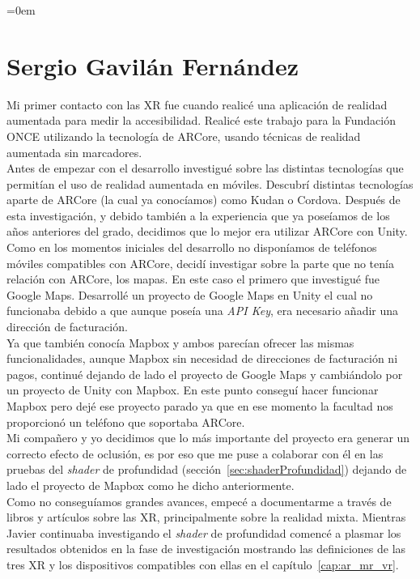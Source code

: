 \parindent=0em
\section{Sergio Gavilán Fernández}
\noindent

Mi primer contacto con las XR fue cuando realicé una aplicación de realidad aumentada para medir la accesibilidad. Realicé este trabajo para la Fundación ONCE utilizando la tecnología de ARCore, usando técnicas de realidad aumentada sin marcadores.\\

Antes de empezar con el desarrollo investigué sobre las distintas tecnologías que permitían el uso de realidad aumentada en móviles. Descubrí distintas tecnologías aparte de ARCore (la cual ya conocíamos) como Kudan o Cordova. Después de esta investigación, y debido también a la experiencia que ya poseíamos de los años anteriores del grado, decidimos que lo mejor era utilizar ARCore con Unity.\\

Como en los momentos iniciales del desarrollo no disponíamos de teléfonos móviles compatibles con ARCore, decidí investigar sobre la parte que no tenía relación con ARCore, los mapas. En este caso el primero que investigué fue Google Maps. Desarrollé un proyecto de Google Maps en Unity el cual no funcionaba debido a que aunque poseía una \textit{API Key}, era necesario añadir una dirección de facturación.\\

Ya que también conocía Mapbox y ambos parecían ofrecer las mismas funcionalidades, aunque Mapbox sin necesidad de direcciones de facturación ni pagos, continué dejando de lado el proyecto de Google Maps y cambiándolo por un proyecto de Unity con Mapbox. En este punto conseguí hacer funcionar Mapbox pero dejé ese proyecto parado ya que en ese momento la facultad nos proporcionó un teléfono que soportaba ARCore.\\

Mi compañero y yo decidimos que lo más importante del proyecto era generar un correcto efecto de oclusión, es por eso que me puse a colaborar con él en las pruebas del \textit{shader} de profundidad (sección~\ref{sec:shaderProfundidad}) dejando de lado el proyecto de Mapbox como he dicho anteriormente.\\

Como no conseguíamos grandes avances, empecé a documentarme a través de libros y artículos sobre las XR, principalmente sobre la realidad mixta. Mientras Javier continuaba investigando el \textit{shader} de profundidad comencé a plasmar los resultados obtenidos en la fase de investigación mostrando las definiciones de las tres XR y los dispositivos compatibles con ellas en el capítulo~\ref{cap:ar_mr_vr}.\\

